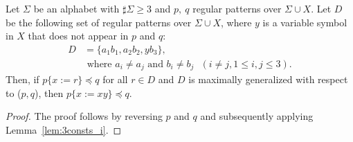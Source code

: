 
\begin{lem}\label{lem:3consts_ii}
  Let $\Sigma$ be an alphabet with $\sharp\Sigma \ge 3$ and $p,~q$ regular patterns {\color{red}over} $\Sigma\cup X$.
  Let $D$ be the following set of regular patterns {\color{red}over} $\Sigma\cup X$, where $y$ is a variable symbol in $X$ that does not appear in $p$ and $q$:
  \begin{align*}
  D & = \{ a_{1}b_{1}, a_{2}b_{2}, yb_{3}\},\\
  & \mbox{ where } a_{i} \ne a_{j} \mbox{ and } b_{i} \ne b_{j} \mbox{ } (i\ne j, 1\le i,j\le 3).
  \end{align*}
  Then, if $p \{ x := r \} \preceq q$ for all $r \in D$ and $D$ is maximally generalized {\color{red}with respect to} ($p,q$), then $p \{ x := xy \} \preceq q$.
\end{lem}

\begin{proof}
%
%
The proof follows by reversing $p$ and $q$ and subsequently applying Lemma~\ref{lem:3consts_i}.
\end{proof}

